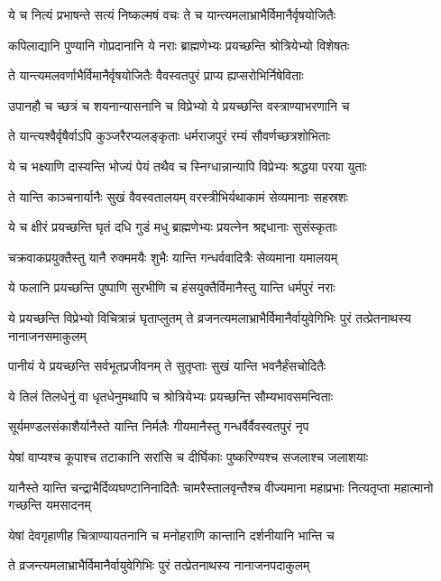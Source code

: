 \twolineshloka
{ये च नित्यं प्रभाषन्ते सत्यं निष्कल्मषं वचः}
{ते च यान्त्यमलाभ्राभैर्विमानैर्वृषयोजितैः}


\twolineshloka
{कपिलाद्यानि पुण्यानि गोप्रदानानि ये नराः}
{ब्राह्मणेभ्यः प्रयच्छन्ति श्रोत्रियेभ्यो विशेषतः}


\twolineshloka
{ते यान्त्यमलवर्णाभैर्विमानैर्वृषयोजितैः}
{वैवस्वतपुरं प्राप्य ह्यप्सरोभिर्निषेविताः}


\twolineshloka
{उपानहौ च च्छत्रं च शयनान्यासनानि च}
{विप्रेभ्यो ये प्रयच्छन्ति वस्त्राण्याभरणानि च}


\twolineshloka
{ते यान्त्यश्वैर्वृषैर्वाऽपि कुञ्जरैरप्यलङ्कृताः}
{धर्मराजपुरं रम्यं सौवर्णच्छत्रशोभिताः}


\twolineshloka
{ये च भक्ष्याणि दास्यन्ति भोज्यं पेयं तथैव च}
{स्निग्धान्नान्यापि विप्रेभ्यः श्रद्धया परया युताः}


\twolineshloka
{ते यान्ति काञ्चनार्यानैः सुखं वैवस्वतालयम्}
{वरस्त्रीभिर्यथाकामं सेव्यमानाः सहस्रशः}


\twolineshloka
{ये च क्षीरं प्रयच्छन्ति घृतं दधि गुडं मधु}
{ब्राह्मणेभ्यः प्रयत्नेन श्रद्दधानाः सुसंस्कृताः}


\twolineshloka
{चक्रवाकप्रयुक्तैस्तु यानै रुक्ममयैः शुभैः}
{यान्ति गन्धर्ववादित्रैः सेव्यमाना यमालयम्}


\twolineshloka
{ये फलानि प्रयच्छन्ति पुष्पाणि सुरभीणि च}
{हंसयुक्तैर्विमानैस्तु यान्ति धर्मपुरं नराः}


\fourlineindentedshloka
{ये प्रयच्छन्ति विप्रेभ्यो विचित्रान्नं घृताप्लुतम्}
{ते व्रजनत्यमलाभ्राभैर्विमानैर्वायुवेगिभिः}
{पुरं तत्प्रेतनाथस्य नानाजनसमाकुलम्}
{}


\twolineshloka
{पानीयं ये प्रयच्छन्ति सर्वभूतप्रजीवनम्}
{ते सुतृप्ताः सुखं यान्ति भवनैर्हंसचोदितैः}


\twolineshloka
{ये तिलं तिलधेनुं वा धृतधेनुमथापि च}
{श्रोत्रियेभ्यः प्रयच्छन्ति सौम्यभावसमन्विताः}


\twolineshloka
{सूर्यमण्डलसंकाशैर्यानैस्ते यान्ति निर्मलैः}
{गीयमानैस्तु गन्धर्वैर्वैवस्वतपुरं नृप}


\twolineshloka
{येषां वाप्यश्च कूपाश्च तटाकानि सरांसि च}
{दीर्घिकाः पुष्करिण्यश्च सजलाश्च जलाशयाः}


\threelineshloka
{यानैस्ते यान्ति चन्द्राभैर्दिव्यघण्टानिनादितैः}
{चामरैस्तालवृन्तैश्च वीज्यमाना महाप्रभाः}
{नित्यतृप्ता महात्मानो गच्छन्ति यमसादनम्}


\twolineshloka
{येषां देवगृहाणीह चित्राण्यायतनानि च}
{मनोहराणि कान्तानि दर्शनीयानि भान्ति च}


\twolineshloka
{ते व्रजन्त्यमलाभ्राभैर्विमानैर्वायुवेगिभिः}
{पुरं तत्प्रेतनाथस्य नानाजनपदाकुलम्}


